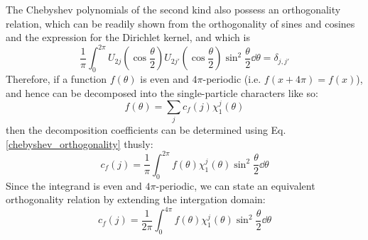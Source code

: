 \documentclass[12pt]{article}
\begin{document}
	The Chebyshev polynomials of the second kind also possess an orthogonality relation, which can be readily shown from the orthogonality of sines and cosines and the expression for the Dirichlet kernel, and which is
	\begin{equation} \label{chebyshev_orthogonality}
	\frac{1}{\pi}\int_0^{2\pi} U_{2j}\left(\cos{\frac{\theta}{2}}\right)U_{2j'}\left(\cos{\frac{\theta}{2}}\right) \sin^2{\frac{\theta}{2}}\dd \theta = \delta_{j,j'}
	\end{equation}
	Therefore, if a function $f(\theta)$ is even and $4\pi$-periodic (i.e. $f(x+4\pi)=f(x)$), and hence can be decomposed into the single-particle characters like so:
	\begin{equation}
	f(\theta) = \sum_j c_f(j) \chi^j_1(\theta)
	\end{equation}
	then the decomposition coefficients can be determined using Eq. \ref{chebyshev_orthogonality} thusly:
	\begin{equation}
	c_f(j) = \frac{1}{\pi} \int_0^{2\pi} f(\theta) \chi^j_1(\theta) \sin^2{\frac{\theta}{2}}\dd \theta
	\end{equation}
	Since the integrand is even and $4\pi$-periodic, we can state an equivalent orthogonality relation by extending the intergation domain:
	\begin{equation} \label{orthogonality_four_pi}
	c_f(j) = \frac{1}{2\pi} \int_0^{4\pi} f(\theta) \chi^j_1(\theta) \sin^2{\frac{\theta}{2}}\dd \theta
	\end{equation}
	
\end{document}

